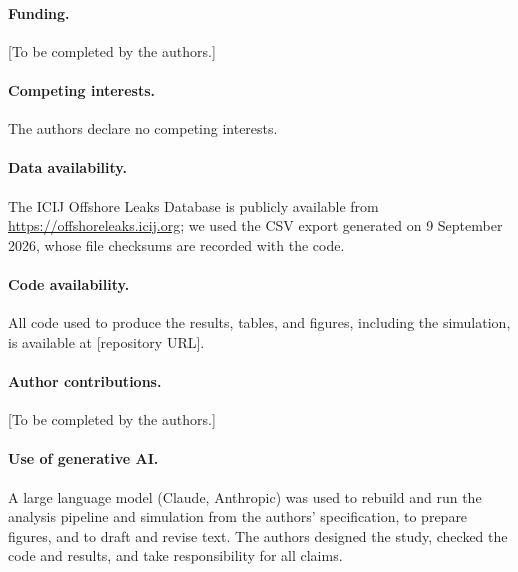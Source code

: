 \documentclass[11pt]{article}
\begin{document}
\paragraph{Funding.} [To be completed by the authors.]
\paragraph{Competing interests.} The authors declare no competing interests. %
\paragraph{Data availability.} The ICIJ Offshore Leaks Database is publicly
available from \url{https://offshoreleaks.icij.org}; we used the CSV export generated
on 9 September 2026, whose file checksums are recorded with the code.
\paragraph{Code availability.} All code used to produce the results, tables, and
figures, including the simulation, is available at [repository URL]. %
\paragraph{Author contributions.} [To be completed by the authors.]
\paragraph{Use of generative AI.} A large language model (Claude, Anthropic) was used
to rebuild and run the analysis pipeline and simulation from the authors'
specification, to prepare figures, and to draft and revise text. The authors
designed the study, checked the code and results, and take responsibility for all
claims.
\end{document}
